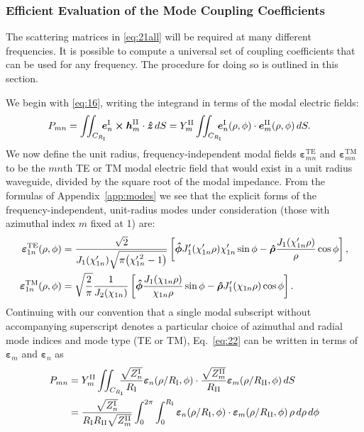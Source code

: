 \documentclass[11pt]{article}
\newcommand{\z}{\boldsymbol{\hat{z}}}
\newcommand{\cross}{\boldsymbol{\times}}
\newcommand{\e}{\boldsymbol{e}}
\newcommand{\enorm}{\boldsymbol{\varepsilon}}
\newcommand{\h}{\boldsymbol{h}}
\newcommand{\I}{\ensuremath{\text{I}}}
\newcommand{\II}{\ensuremath{\text{II}}}
\newcommand{\eI}{\e^{\text{I}}}
\newcommand{\eII}{\e^{\text{II}}}
\newcommand{\hII}{\h^{\text{II}}}
\newcommand{\phihat}{\boldsymbol{\hat{\phi}}}
\newcommand{\rhohat}{\boldsymbol{\hat{\rho}}}
\newcommand{\TE}{\text{TE}}
\newcommand{\TM}{\text{TM}}
\newcommand{\psq}{^{\prime \,\raisebox{0.2ex}{$\scriptstyle2$}}}
\begin{document}
\subsubsection{Efficient Evaluation of the Mode Coupling Coefficients}
The scattering matrices in \eqref{eq:21all} will be required at many
different frequencies. It is possible to compute a universal set of 
coupling coefficients that can be used for any frequency. The procedure for doing so is
outlined in this section.

We begin with \eqref{eq:16}, writing the integrand in terms of the
modal electric fields:
\begin{align}
  \label{eq:22}
  P_{mn} &=  
  \iint_{C_{R_{\I}}} \mkern-12mu \eI_n \cross \hII_m \cdot \z \, dS 
  = Y^\II_m
  \iint_{C_{R_{\I}}} \mkern-12mu \eI_n(\rho,\phi) \cdot \eII_m(\rho,\phi) \, dS. 
\end{align}
We now define the unit radius, frequency-independent modal fields
$\enorm^{\TE}_{mn}$ and $\enorm^{\TM}_{mn}$ to be the
$mn$th TE or TM modal electric field that would exist in a unit radius
waveguide, divided by the square root of the modal impedance.
From the formulas of Appendix~\ref{app:modes} we see that the explicit
forms of the frequency-independent, unit-radius modes under
consideration (those with azimuthal index $m$ fixed at 1) are: 
\begin{subequations}
  \label{eq:findmodes}
  \begin{align}
    \enorm^{\TE}_{1n}(\rho,\phi) &=
    \frac{\sqrt{2}}{J_1(\chi'_{1n})\sqrt{\pi\bigl(\chi\psq_{1n}-1\bigr)}}
    \left[
      \phihat J'_1(\chi'_{1n}\rho)\chi'_{1n} \sin\phi
      - \rhohat \frac{J_1(\chi'_{1n}\rho)}{\rho} \cos\phi
    \right],
    \\
    \enorm^{\TM}_{1n}(\rho,\phi) &=
    \sqrt{\frac{2}{\pi}} \frac{1}{J_2(\chi_{1n})}
    \left[
      \phihat  \frac{J_1(\chi_{1n}\rho)}{\chi_{1n}\rho} \sin\phi
      - \rhohat J'_1(\chi_{1n}\rho)\cos\phi
    \right].
  \end{align}
\end{subequations}
%
%
Continuing with our convention that a single modal subscript without
accompanying superscript denotes a particular choice of azimuthal and
radial mode indices and mode type (TE or TM), 
Eq.~\eqref{eq:22} can be written in terms of $\enorm_m$ and
$\enorm_n$ as 
\begin{align}
  \label{eq:Pmnnew}
  P_{mn} &= 
  Y^\II_m
  \iint_{C_{R_{\I}}} \mkern-12mu 
  \frac{\sqrt{Z^{\I}_n}}{R_{\I}}\enorm_n(\rho/R_{\I},\phi) \cdot 
  \frac{\sqrt{Z^{\II}_m}}{R_{\II}}\enorm_m(\rho/R_{\II},\phi) \, dS
  \nonumber \\
  &=
  \frac{\sqrt{Z^{\I}_n}}{R_{\I} R_{\II} \sqrt{Z^{\II}_m}}
  \int_0^{2\pi} \int_0^{R_{\I}}
  \enorm_n(\rho/R_{\I},\phi) \cdot 
  \enorm_m(\rho/R_{\II},\phi) \, \rho \, d\rho \, d\phi
\end{align}
\end{document}
